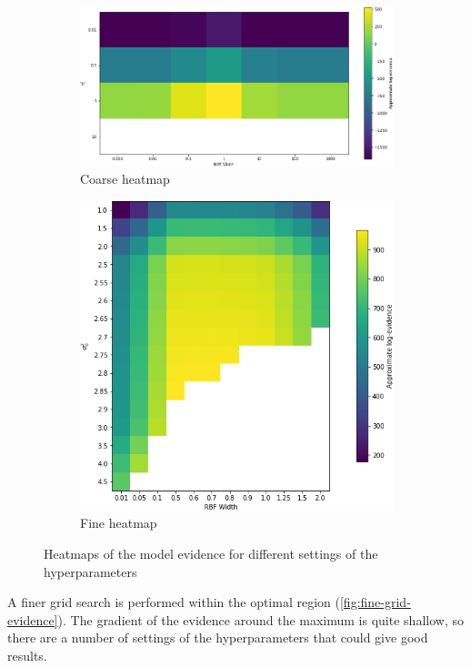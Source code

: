 \documentclass[a4paper]{article}
\begin{document}
    \begin{figure}[h]
        \begin{subfigure}{0.45\textwidth}
            \centering
            \includegraphics[width=\textwidth]{plots/bayesian_logistic_classification/coarse_grid_evidence.png}
            \caption{Coarse heatmap}
            \label{fig:coarse-grid-evidence}
        \end{subfigure}
        \hfill
        \begin{subfigure}{0.5\textwidth}
            \centering
            \includegraphics[width=\textwidth]{plots/bayesian_logistic_classification/fine_grid_evidence.png}
            \caption{Fine heatmap}
            \label{fig:fine-grid-evidence}
        \end{subfigure}
        \caption{Heatmaps of the model evidence for different settings of the hyperparameters}
    \end{figure}
    A finer grid search is performed within the optimal region (\autoref{fig:fine-grid-evidence}).
    The gradient of the evidence around the maximum is quite shallow, so there are a number of settings of the hyperparameters that could give good results.
\end{document}
